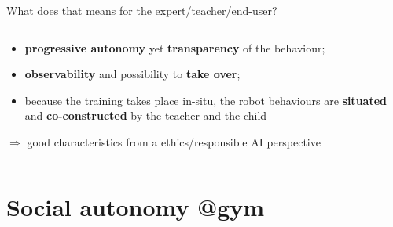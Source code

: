 \documentclass[xcolor=table]{beamer}
\begin{document}
\begin{frame}{What does that means for the expert/teacher/end-user?}
\begin{columns}
\begin{column}{0.55\linewidth}
{            \begin{itemize}
                \item \textbf{progressive autonomy} yet
                    \textbf{transparency} of the behaviour;
                \item \textbf{observability} and possibility to \textbf{take
                    over};
                \item because the training takes place in-situ, the
                    robot behaviours are \textbf{situated} and \textbf{co-constructed} by the
                    teacher and the child
            \end{itemize}
                $\Rightarrow$ good characteristics from a
                    ethics/responsible AI perspective
        }
        \end{column}
    \end{columns}


\end{frame}

\section*{Social autonomy @gym}

\end{document}

